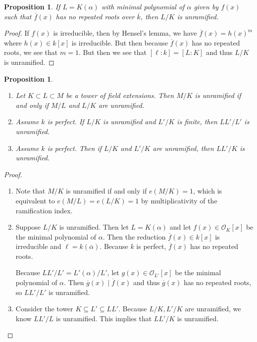 \documentclass[leqno, openany]{memoir}
\newtheorem{prop}[thm]{Proposition}
\theoremstyle{definition}
\theoremstyle{remark}
\theoremstyle{plain}
\theoremstyle{definition}
\theoremstyle{remark}
\newcommand{\mc}[1]{\mathcal{#1}}
\newcommand{\ol}[1]{\overline{#1}}
\begin{document}
\begin{prop} If $L = K(\alpha)$ with minimal polynomial of $\alpha$ given by
$f(x)$ such that $\ol{f}(x)$ has no repeated roots over $\ol{k}$, then $L/K$ is
unramified.  \end{prop}

\begin{proof} If $f(x)$ is irreducible, then by Hensel's lemma, we have
    $\ol{f}(x) = h(x)^m$ where $h(x) \in k[x]$ is irreducible. But then because
    $\ol{f}(x)$ has no repeated roots, we see that $m = 1$. But then we see
    that $[\ell : k] = [L:K]$ and thus $L/K$ is unramified.  \end{proof}

\begin{prop}\leavevmode \begin{enumerate} \item Let $K \subset L \subset M$ be
    a tower of field extensions. Then $M/K$ is unramified if and only if $M/L$
    and $L/K$ are unramified.  \item Assume $k$ is perfect. If $L/K$ is
    unramified and $L'/K$ is finite, then $LL'/L'$ is unramified.  \item Assume
    $k$ is perfect. Then if $L/K$ and $L'/K$ are unramified, then $LL'/K$ is
    unramified.  \end{enumerate} \end{prop}

\begin{proof}\leavevmode \begin{enumerate} \item Note that $M/K$ is unramified
    if and only if $e(M/K) = 1$, which is equivalent to $e(M/L) = e(L/K) = 1$
    by multiplicativity of the ramification index.  \item Suppose $L/K$ is
    unramified. Then let $L = K(\alpha)$ and let $f(x) \in \mc{O}_K[x]$ be the
    minimal polynomial of $\alpha$. Then the reduction $\ol{f}(x) \in k[x]$ is
    irreducible and $\ell = k(\ol{\alpha})$. Because $k$ is perfect,
    $\ol{f}(x)$ has no repeated roots.

            Because $LL'/L' = L'(\alpha)/L'$, let $g(x) \in \mc{O}_{L'}[x]$ be
            the minimal polynomial of $\alpha$. Then $\ol{g}(x) \mid \ol{f}(x)$
            and thus $\ol{g}(x)$ has no repeated roots, so $LL'/L'$ is
            unramified.  \item Consider the tower $K \subseteq L' \subseteq
            LL'$. Because $L/K, L'/K$ are unramified, we know $LL'/L$ is
            unramified. This implies that $LL'/K$ is unramified. \qedhere
    \end{enumerate} \end{proof}
\end{document}

